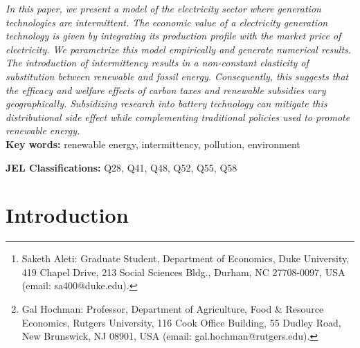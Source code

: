 \documentclass[11pt,a4paper,leqno]{extarticle}
\begin{document}
	
	\title{}
	
	\author[]{Saketh Aleti\thanks{Saketh Aleti: Graduate Student, Department of Economics, Duke University, 419 Chapel Drive, 213 Social Sciences Bldg., Durham, NC 27708-0097, USA (email: sa400@duke.edu).}  \, and  Gal Hochman\thanks{ Gal Hochman: Professor, Department of Agriculture, Food \& Resource Economics, Rutgers University, 116 Cook Office Building, 55 Dudley Road, New Brunswick, NJ 08901, USA (email: gal.hochman@rutgers.edu).}}
	
	
	\maketitle
	
	\begin{addmargin}[0.5in]{0.5in}
		\textit{In this paper, we present a model of the electricity sector where generation technologies are intermittent. The economic value of a electricity generation technology is given by integrating its production profile with the market price of electricity. We parametrize this model empirically and generate numerical results. The introduction of intermittency results in a non-constant elasticity of substitution between renewable and fossil energy. Consequently, this suggests that the efficacy and welfare effects of carbon taxes and renewable subsidies vary geographically. Subsidizing research into battery technology can mitigate this distributional side effect while complementing traditional policies used to promote renewable energy. 
		}
		\\
		\noindent\textbf{Key words:} renewable energy, intermittency, pollution, environment
		
		\noindent\textbf{JEL Classifications:} Q28, Q41, Q48, Q52, Q55, Q58
	\end{addmargin}
	
	
	
	
	
	
	\section{Introduction}
	
	
	
\end{document}
